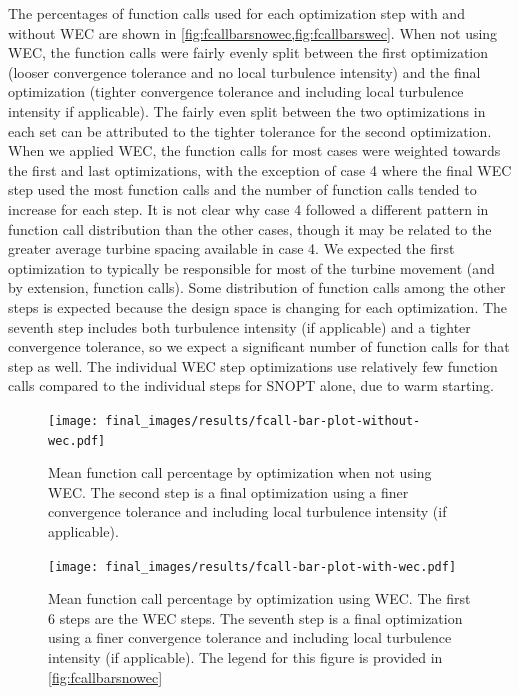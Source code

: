 \documentclass{jpconf}
\begin{document}
The percentages of function calls used for each optimization step with and without WEC are shown in \cref{fig:fcallbarsnowec,fig:fcallbarswec}. When not using WEC, the function calls were fairly evenly split between the first optimization (looser convergence tolerance and no local turbulence intensity) and the final optimization (tighter convergence tolerance and including local turbulence intensity if applicable). The fairly even split between the two optimizations in each set can be attributed to the tighter tolerance for the second optimization. When we applied WEC, the function calls for most cases were weighted towards the first and last optimizations, with the exception of case 4 where the final WEC step used the most function calls and the number of function calls tended to increase for each step. It is not clear why case 4 followed a different pattern in function call distribution than the other cases, though it may be related to the greater average turbine spacing available in case 4. We expected the first optimization to typically be responsible for most of the turbine movement (and by extension, function calls). Some distribution of function calls among the other steps is expected because the design space is changing for each optimization. The seventh step includes both turbulence intensity (if applicable) and a tighter convergence tolerance, so we expect a significant number of function calls for that step as well. The individual WEC step optimizations use relatively few function calls compared to the individual steps for SNOPT alone, due to warm starting.

\begin{figure}[h!]
	\centering
	\begin{minipage}[t]{.45\textwidth}
		\centering
		\texttt{[image: final\_images/results/fcall-bar-plot-without-wec.pdf]}  
		\caption{Mean function call percentage by optimization when not using WEC. The second step is a final optimization using a finer convergence tolerance and including local turbulence intensity (if applicable).}
		\label{fig:fcallbarsnowec}
	\end{minipage} \hspace{1pc}
	\begin{minipage}[t]{.45\textwidth}
		\centering
		\texttt{[image: final\_images/results/fcall-bar-plot-with-wec.pdf]}  
		\caption{Mean function call percentage by optimization using WEC. The first 6 steps are the WEC steps. The seventh step is a final optimization using a finer convergence tolerance and including local turbulence intensity (if applicable). The legend for this figure is provided in \cref{fig:fcallbarsnowec}}
		\label{fig:fcallbarswec}
	\end{minipage} 
\end{figure}
\end{document}
